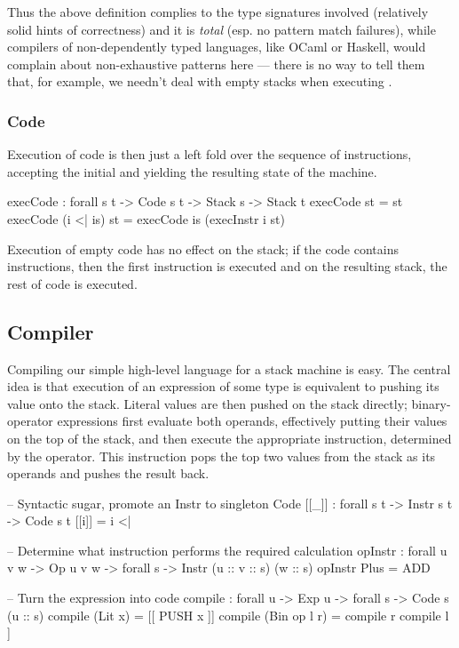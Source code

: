 Thus the above definition complies to the type signatures involved (relatively
solid hints of correctness) and it is \emph{total} (esp. no pattern match failures),
while compilers of non-dependently typed languages, like OCaml or Haskell,
would complain about non-exhaustive patterns here --- there is no way to tell them
that, for example, we needn't deal with empty stacks when executing .


\subsubsection{Code}

Execution of code is then just a left fold over the sequence of instructions,
accepting the initial and yielding the resulting state of the machine.

\begin{code}
  execCode : forall {s t} -> Code s t -> Stack s -> Stack t
  execCode \nil st = st
  execCode (i <| is) st = execCode is (execInstr i st)
\end{code}

\noindent Execution of empty code has no effect on the stack; if the code
contains instructions, then the first instruction is executed and on the
resulting stack, the rest of code is executed.

\subsection{Compiler}

Compiling our simple high-level language for a stack machine is easy. The
central idea is that execution of an expression of some type is equivalent to
pushing its value onto the stack. Literal values are then pushed on the stack
directly; binary-operator expressions first evaluate both operands, effectively
putting their values on the top of the stack, and then execute the appropriate
instruction, determined by the operator. This instruction pops the top
two values from the stack as its operands and pushes the result back.

\label{sec:simple-compiler}\begin{code}
  -- Syntactic sugar, promote an Instr to singleton Code
  [[_\;]] : forall {s t} -> Instr s t -> Code s t
  [[i\;]] = i <| \nil

  -- Determine what instruction performs the required calculation
  opInstr : forall {u v w} -> Op u v w -> forall {s} -> Instr (u :: v :: s) (w :: s)
  opInstr Plus = ADD

  -- Turn the expression into code
  compile : forall {u} -> Exp u -> forall {s} -> Code s (u :: s)
  compile (Lit x) = [[ PUSH x ]]
  compile (Bin op l r) = compile r \app compile l \app [[ opInstr op ]]
\end{code}

